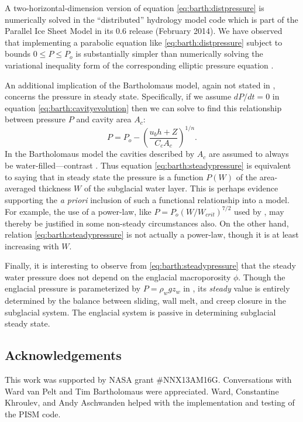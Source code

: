 \documentclass[review,letterpaper]{igs}
\begin{document}
A two-horizontal-dimension version of equation \eqref{eq:barth:distpressure} is numerically solved in the ``distributed'' hydrology model code which is part of the Parallel Ice Sheet Model in its 0.6 release (February 2014).  We have observed that implementing a parabolic equation like \eqref{eq:barth:distpressure} subject to bounds $0 \le P \le P_o$ is substantially simpler than numerically solving the variational inequality form of the corresponding elliptic pressure equation \citep{Schoofetal2012}. 

An additional implication of the Bartholomaus model, again not stated in \cite{Bartholomausetal2011}, concerns the pressure in steady state.  Specifically, if we assume $dP/dt=0$ in equation \eqref{eq:barth:cavityevolution} then we can solve to find this relationship between pressure $P$ and cavity area $A_c$:
\begin{equation}
P = P_o - \left(\frac{u_b h + Z}{C_c A_c}\right)^{1/n}. \label{eq:barth:steadypressure}
\end{equation}
In the Bartholomaus model the cavities described by $A_c$ are assumed to always be water-filled---contrast \citep{Schoofetal2012}.  Thus equation \eqref{eq:barth:steadypressure} is equivalent to saying that in steady state the pressure is a function $P(W)$ of the area-averaged thickness $W$ of the subglacial water layer.  This is perhaps evidence supporting the \emph{a priori} inclusion of such a functional relationship into a model.  For example, the use of a power-law, like $P = P_o (W/W_{crit})^{7/2}$ used by \cite{FlowersClarke2002_theory}, may thereby be justified in some non-steady circumstances also.  On the other hand, relation \eqref{eq:barth:steadypressure} is not actually a power-law, though it is at least increasing with $W$.

Finally, it is interesting to observe from \eqref{eq:barth:steadypressure} that the steady water pressure does not depend on the englacial macroporosity $\phi$.  Though the englacial pressure is parameterized by $P=\rho_w g z_w$ in \cite{Bartholomausetal2011}, its \emph{steady} value is entirely determined by the balance between sliding, wall melt, and creep closure in the subglacial system.  The englacial system is passive in determining subglacial steady state.


\subsection*{Acknowledgements}  This work was supported by NASA grant \#NNX13AM16G.  Conversations with Ward van Pelt and Tim Bartholomaus were appreciated.  Ward, Constantine Khroulev, and Andy Aschwanden helped with the implementation and testing of the PISM code.



\end{document}

